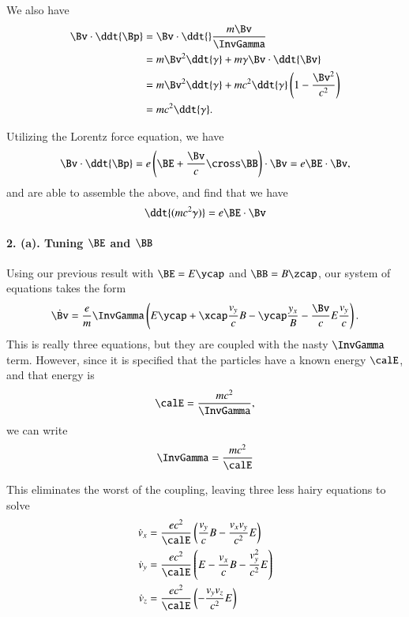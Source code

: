 {We also have
%
\begin{equation}\label{eqn:relElectroDynProblemSet2:1170}
\begin{aligned}
\Bv \cdot \ddt{\Bp}
&= \Bv \cdot \ddt{} \frac{m \Bv}{\InvGamma} \\
&= m\Bv^2 \ddt{\gamma} + m \gamma \Bv \cdot \ddt{\Bv} \\
&= m\Bv^2 \ddt{\gamma} + m c^2 \ddt{\gamma} \left( 1 - \frac{\Bv^2}{c^2} \right) \\
&= m c^2 \ddt{\gamma}.
\end{aligned}
\end{equation}

Utilizing the Lorentz force equation, we have
%
\begin{equation}\label{eqn:relElectroDynProblemSet2:250}
\Bv \cdot \ddt{\Bp} = e \left( \BE + \frac{\Bv}{c} \cross \BB \right) \cdot \Bv = e \BE \cdot \Bv,
\end{equation}
and are able to assemble the above, and find that we have
\begin{equation}\label{eqn:relElectroDynProblemSet2:270}
\ddt{(m c^2 \gamma)} = e \BE \cdot \Bv
\end{equation}
\paragraph{2. (a). Tuning \texorpdfstring{\(\BE\) and \(\BB\)}{E and B}}
Using our previous result with \(\BE = E \ycap\) and \(\BB = B \zcap\), our system of equations takes the form
%
\begin{equation}\label{eqn:relElectroDynProblemSet2:290}
\dot{\Bv} = \frac{e}{m} \InvGamma \left( E \ycap + \xcap \frac{v_y}{c} B - \ycap \frac{y_x} B - \frac{\Bv}{c} E \frac{v_y}{c} \right).
\end{equation}
This is really three equations, but they are coupled with the nasty \(\InvGamma\) term.  However, since it is specified that the particles have a known energy \(\calE\), and that energy is
%
\begin{equation}\label{eqn:relElectroDynProblemSet2:310}
\calE = \frac{ m c^2 }{\InvGamma},
\end{equation}
we can write
%
\begin{equation}\label{eqn:relElectroDynProblemSet2:330}
\InvGamma = \frac{ m c^2 }{\calE}
\end{equation}

This eliminates the worst of the coupling, leaving three less hairy equations to solve
%
\begin{equation}\label{eqn:relElectroDynProblemSet2:350}
\begin{aligned}
\dot{v}_x &= \frac{e c^2}{\calE} \left( \frac{v_y}{c} B - \frac{v_x v_y}{c^2} E \right) \\
\dot{v}_y &= \frac{e c^2}{\calE} \left( E - \frac{v_x}{c} B - \frac{v_y^2}{c^2} E \right) \\
\dot{v}_z &= \frac{e c^2}{\calE} \left( - \frac{v_y v_z}{c^2} E \right)
\end{aligned}
\end{equation}

}
